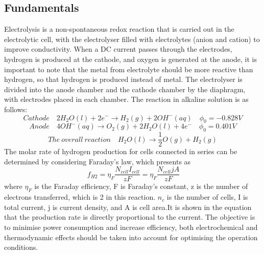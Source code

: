 \subsection{Fundamentals} 
Electrolysis is a non-spontaneous redox reaction that is carried out in the electrolytic cell, with the electrolyser filled with electrolytes (anion and cation) to improve conductivity. When a DC current passes through the electrodes, hydrogen is produced at the cathode, and oxygen is generated at the anode, it is important to note that the metal from electrolyte should be more reactive than hydrogen, so that hydrogen is produced instead of metal. The electrolyser is divided into the anode chamber and the cathode chamber by the diaphragm, with electrodes placed in each chamber. The reaction in alkaline solution is as follows:
\begin{equation} 
Cathode \quad 2H_2 O(l) + 2e^- \rightarrow H_2(g) + 2OH^-(aq)\quad   \phi_0=-0.828V
\end{equation} 
\begin{equation} 
Anode \quad 4OH^-(aq) \rightarrow O_2(g) +2H_2O(l) +4e^- \quad \phi_0=0.401V
\end{equation} 
\begin{equation} 
The \ overall \ reaction \quad H_2O(l) \rightarrow \frac{1}{2} O(g) + H_2(g) 
\end{equation} 
The molar rate of hydrogen production for cells connected in series can be determined by considering Faraday's law, which presents as 
\begin{equation} 
\ f_{H2} = \eta_F \frac{N_{cell}I_{cell}}{zF} =\eta_F\frac{N_{cell} jA}{zF} 
\end{equation} 
where $\eta_F$ is the Faraday efficiency, F is Faraday's constant, z is the number of electrons transferred, which is 2 in this reaction. $n_c$ is the number of cells, I is total current, j is current density, and A is cell area.It is shown in the equation that the production rate is directly proportional to the current. \cite{rate} The objective is to minimise power consumption and increase efficiency, both electrochemical and thermodynamic effects should be taken into account for optimising the operation conditions.


